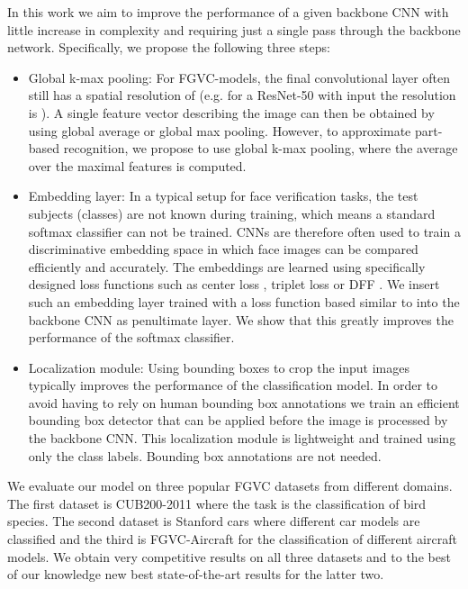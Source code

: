 \documentclass[10pt,twocolumn,letterpaper]{article}
\begin{document}
In this work we aim to improve the performance of a given backbone CNN with little increase in complexity and requiring just a single pass through the backbone network. Specifically, we propose the following three steps:
\begin{itemize}
  \item Global k-max pooling: For FGVC-models, the final convolutional layer often still has a spatial resolution of  (e.g. for a ResNet-50 with  input the resolution is ). A single feature vector describing the image can then be obtained by using global average or global max pooling. However, to approximate part-based recognition, we propose to use global k-max pooling, where the average over the  maximal features is computed.
  \item Embedding layer: In a typical setup for face verification tasks, the test subjects (\ie classes) are not known during training, which means a standard softmax classifier can not be trained. CNNs are therefore often used to train a discriminative embedding space in which face images can be compared efficiently and accurately. The embeddings are learned using specifically designed loss functions such as center loss \cite{wen2016discriminative}, triplet loss \cite{schroff2015facenet} or DFF \cite{hanselmann2017deep}. We insert such an embedding layer trained with a loss function based similar to \cite{hanselmann2017deep} into the backbone CNN as penultimate layer. We show that this greatly improves the performance of the softmax classifier.
  \item Localization module: Using bounding boxes to crop the input images typically improves the performance of the classification model. In order to avoid having to rely on human bounding box annotations we train an efficient bounding box detector that can be applied before the image is processed by the backbone CNN. This localization module is lightweight and trained using only the class labels. Bounding box annotations are not needed.
\end{itemize}

We evaluate our model on three popular FGVC datasets from different domains. The first dataset is CUB200-2011 \cite{birds} where the task is the classification of bird species. The second dataset is Stanford cars \cite{cars} where different car models are classified and the third is FGVC-Aircraft \cite{aircraft} for the classification of different aircraft models. We obtain very competitive results on all three datasets and to the best of our knowledge new best state-of-the-art results for the latter two.
\end{document}
